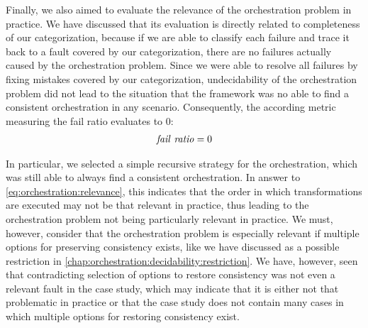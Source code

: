 

Finally, we also aimed to evaluate the relevance of the orchestration problem in practice.
We have discussed that its evaluation is directly related to completeness of our categorization, because if we are able to classify each failure and trace it back to a fault covered by our categorization, there are no failures actually caused by the orchestration problem.
Since we were able to resolve all failures by fixing mistakes covered by our categorization, undecidability of the orchestration problem did not lead to the situation that the \vitruv framework was no able to find a consistent orchestration in any scenario.
Consequently, the according metric measuring the fail ratio evaluates to $0$:
\begin{align*}
    \mathit{fail\ ratio} = 0
\end{align*}

In particular, we selected a simple recursive strategy for the orchestration, which was still able to always find a consistent orchestration.
In answer to \autoref{eq:orchestration:relevance}, this indicates that the order in which transformations are executed may not be that relevant in practice, thus leading to the orchestration problem not being particularly relevant in practice.
We must, however, consider that the orchestration problem is especially relevant if multiple options for preserving consistency exists, like we have discussed as a possible restriction in \autoref{chap:orchestration:decidability:restriction}.
We have, however, seen that contradicting selection of options to restore consistency was not even a relevant fault in the case study, which may indicate that it is either not that problematic in practice or that the case study does not contain many cases in which multiple options for restoring consistency exist.

